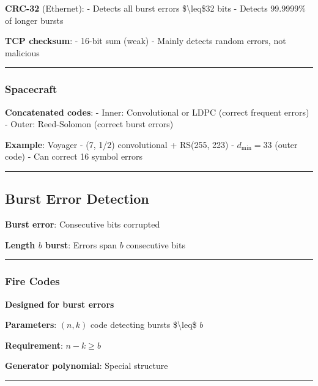 \textbf{CRC-32} (Ethernet): - Detects all burst errors
\$\textbackslash leq\$32 bits - Detects 99.9999\% of longer bursts

\textbf{TCP checksum}: - 16-bit sum (weak) - Mainly detects random
errors, not malicious

\begin{center}\rule{0.5\linewidth}{0.5pt}\end{center}

\subsubsection{Spacecraft}\label{spacecraft}

\textbf{Concatenated codes}: - Inner: Convolutional or LDPC (correct
frequent errors) - Outer: Reed-Solomon (correct burst errors)

\textbf{Example}: Voyager - (7, 1/2) convolutional + RS(255, 223) -
\(d_{\min} = 33\) (outer code) - Can correct 16 symbol errors

\begin{center}\rule{0.5\linewidth}{0.5pt}\end{center}

\subsection{Burst Error Detection}\label{burst-error-detection}

\textbf{Burst error}: Consecutive bits corrupted

\textbf{Length \(b\) burst}: Errors span \(b\) consecutive bits

\begin{center}\rule{0.5\linewidth}{0.5pt}\end{center}

\subsubsection{Fire Codes}\label{fire-codes}

\textbf{Designed for burst errors}

\textbf{Parameters}: \((n, k)\) code detecting bursts
\$\textbackslash leq\$ \(b\)

\textbf{Requirement}: \(n - k \geq b\)

\textbf{Generator polynomial}: Special structure

\begin{center}\rule{0.5\linewidth}{0.5pt}\end{center}

